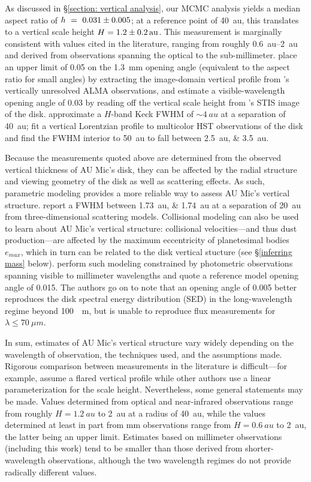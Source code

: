 \documentclass[12pt,oneside]{book}
\begin{document}
As discussed in \S \ref{section: vertical analysis}, our MCMC analysis yields a median aspect ratio of \linebreak $h~=~\num{0.031 \pm 0.005}$; at a reference point of \SI{40}{au}, this translates to a vertical scale height $H = \SI{1.2 \pm 0.2}{au}$.
This measurement is marginally consistent with values cited in the literature, ranging from roughly \SIrange{0.6}{2}{au} and derived from observations spanning the optical to the sub-millimeter.
\cite{schuppler17} place an upper limit of 0.05 on the \SI{1.3}{mm} opening angle (equivalent to the aspect ratio for small angles) by extracting the image-domain vertical profile from \cite{macgregor13}'s vertically unresolved ALMA observations, and estimate a visible-wavelength opening angle of 0.03 by reading off the vertical scale height from \cite{schneider14}'s STIS image of the disk.
\cite{metchev05} approximate a $H$-band Keck FWHM of $\sim \SI{4}{au}$ at a separation of \SI{40}{au};
\cite{krist05} fit a vertical Lorentzian profile to multicolor HST observations of the disk and find the FWHM interior to \SI{50}{au} to fall between \SIlist{2.5;3.5}{au}.

Because the measurements quoted above are determined from the observed vertical thickness of AU Mic's disk, they can be affected by the radial structure and viewing geometry of the disk as well as scattering effects. 
As such, parametric modeling provides a more reliable way to assess AU Mic's vertical structure.
\cite{krist05} report a FWHM between \SIlist{1.73;1.74}{au} at a separation of \SI{20}{au} from three-dimensional scattering models.
Collisional modeling can also be used to learn about AU Mic's vertical structure: collisional velocities---and thus dust production---are affected by the maximum eccentricity of planetesimal bodies $e_{max}$, which in turn can be related to the disk vertical stucture (see \S \ref{inferring mass} below). 
\cite{schuppler17} perform such modeling constrained by photometric observations spanning visible to millimeter wavelengths and quote a reference model opening angle of 0.015.
The authors go on to note that an opening angle of 0.005 better reproduces the disk spectral energy distribution (SED) in the long-wavelength regime beyond \SI{100}{\mu m}, but is unable to reproduce flux measurements for $\lambda \leq \SI{70}{\mu m}$.

In sum, estimates of AU Mic's vertical structure vary widely depending on the wavelength of observation, the techniques used, and the assumptions made.
Rigorous comparison between measurements in the literature is difficult---for example, \cite{krist05} assume a flared vertical profile while other authors use a linear parameterization for the scale height.
Nevertheless, some general statements may be made.
Values determined from optical and near-infrared observations range from roughly $H = \SI{1.2}{au}$ to \SI{2}{au} at a radius of \SI{40}{au}, while the values determined at least in part from mm observations range from $H = \SI{0.6}{au}$ to \SI{2}{au}, the latter being an upper limit. 
Estimates based on millimeter observations (including this work) tend to be smaller than those derived from shorter-wavelength observations, although the two wavelength regimes do not provide radically different values.
\end{document}

